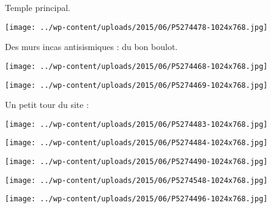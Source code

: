  

 Temple principal. 

 

\begin{center} \texttt{[image: ../wp-content/uploads/2015/06/P5274478-1024x768.jpg]} \end{center}

 

 Des murs incas antisismiques : du bon boulot. 

 

\begin{center} \texttt{[image: ../wp-content/uploads/2015/06/P5274468-1024x768.jpg]} \end{center}

 

 

\begin{center} \texttt{[image: ../wp-content/uploads/2015/06/P5274469-1024x768.jpg]} \end{center}

 

 Un petit tour du site : 

 

\begin{center} \texttt{[image: ../wp-content/uploads/2015/06/P5274483-1024x768.jpg]} \end{center}

 

 

\begin{center} \texttt{[image: ../wp-content/uploads/2015/06/P5274484-1024x768.jpg]} \end{center}

 

 

\begin{center} \texttt{[image: ../wp-content/uploads/2015/06/P5274490-1024x768.jpg]} \end{center}

 

 

\begin{center} \texttt{[image: ../wp-content/uploads/2015/06/P5274548-1024x768.jpg]} \end{center}

 

 

\begin{center} \texttt{[image: ../wp-content/uploads/2015/06/P5274496-1024x768.jpg]} \end{center}

